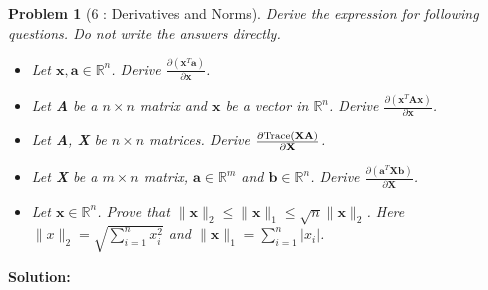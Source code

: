 \documentclass[11pt]{article}
\theoremstyle{quest}
\newtheorem*{question}{Problem}
\newcommand{\R}{\mathbb{R}}
\begin{document}
\begin{question}[6 : Derivatives and Norms]
Derive the expression for following questions. Do not write the answers directly.
\begin{itemize}
\item[(a)] Let $\textbf{x}, \textbf{a} \in \R^n$. Derive $\frac{\partial \left(\textbf{x}^T\textbf{a}\right)}{\partial \textbf{x}}$.
\item[(b)] Let \textbf{A} be a $n\times n$ matrix and $\textbf{x}$ be a vector in $\R^n$. Derive $\frac{\partial \left(\textbf{x}^T\textbf{A}\textbf{x} \right)}{\partial \textbf{x}}$.
\item[(c)] Let \textbf{A}, \textbf{X} be $n\times n$ matrices. Derive $\frac{\partial \text{Trace(\textbf{XA})}}{\partial \textbf{X}}$.
\item[(d)] Let \textbf{X} be a $m\times n$ matrix, $\textbf{a}\in \R^m$ and $\textbf{b}\in \R^n$. Derive $\frac{\partial \left(\textbf{a}^T\textbf{Xb}\right)}{\partial \textbf{X}}$.
\item[(e)] Let $\textbf{x}\in \R^n$. Prove that $\|\textbf{x}\|_2 \leq \|\textbf{x}\|_1 \leq \sqrt{n}\|\textbf{x}\|_2$. Here $\|x\|_2=\sqrt{\sum_{i=1}^{n} x_i^2}$ and $\|\textbf{x}\|_1=\sum_{i=1}^{n} |x_i|$.
\end{itemize}
\end{question}
\textbf{Solution:}

\end{document}
